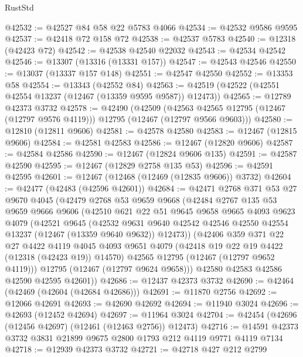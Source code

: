 \begin{lexlean}{RustStd}
\begin{coremodule}
@42532 := @42527 @84 @58 @22 @5783 @4066
@42534 := @42532 @9586 @9595
@42537 := @42418 @72 @158 @72
@42538 := @42537 @5783
@42540 := @12318 (@42423 @72)
@42542 := @42538 @42540 @22032
@42543 := @42534 @42542
@42546 := @13307 (@13316 (@13331 @157))
@42547 := @42543 @42546
@42550 := @13037 (@13337 @157 @148)
@42551 := @42547 @42550
@42552 := @13353 @58
@42554 := @13343 (@42552 @84)
@42563 := @42519 (@42522 (@42551 @42554 @13237 (@12467 (@13359 @9595 @9587)) @12473))
@42565 := @12789 @42373 @3732
@42578 := @42490
    (@42509
      (@42563 @42565 @12795 (@12467 (@12797 @9576 @4119)))
      @12795
      (@12467 (@12797 @9566 @9603)))
@42580 := @12810 (@12811 @9606)
@42581 := @42578 @42580
@42583 := @12467 (@12815 @9606)
@42584 := @42581 @42583
@42586 := @12467 (@12820 @9606)
@42587 := @42584 @42586
@42590 := @12467 (@12824 @9606 @135)
@42591 := @42587 @42590
@42595 := @12467 (@12829 @2758 @135 @53)
@42596 := @42591 @42595
@42601 := @12467 (@12468 (@12469 (@12835 @9606)) @3732)
@42604 := @42477 (@42483 (@42596 @42601))
@42684 := @42471
    @2768
    @371
    @53
    @27
    @9670
    @4045
    (@42479
      @2768
      @53
      @9659
      @9668
      (@42484
        @2767
        @135
        @53
        @9659
        @9666
        @9606
        (@42510
          @621
          @22
          @51
          @9645
          @9658
          @9665
          @4093
          @9623
          @4079
          (@42521
            @9645
            (@42532
              @9631
              @9640
              @42542
              @42546
              @42550
              @42554
              @13237
              (@12467 (@13359 @9640 @9632))
              @12473))
          (@42406
            @359
            @371
            @22
            @27
            @4422
            @4119
            @4045
            @4093
            @9651
            @4079
            (@42418 @19 @22 @19 @4422 (@12318 (@42423 @19)) @14570)
            @42565
            @12795
            (@12467 (@12797 @9652 @4119)))
          @12795
          (@12467 (@12797 @9624 @9658)))
        @42580
        @42583
        @42586
        @42590
        @42595
        @42601))
@42686 := @12437 @42373 @3732
@42690 := @42464 (@42469 (@42604 (@42684 @42686)))
@42691 := @11870 @2756
@42692 := @12066 @42691
@42693 := @42690 @42692
@42694 := @11940 @3024
@42696 := @42693 (@12452 @42694)
@42697 := @11964 @3024
@42704 := @42454 (@42696 (@12456 @42697) (@12461 (@12463 @2756)) @12473)
@42716 := @14591 @42373 @3732 @3831 @21899 @9675 @2800 @1793 @212 @4119 @9771 @4119 @7134
@42718 := @12939 @42373 @3732
@42721 := @42718 @427 @212 @2799

\end{coremodule}
\end{lexlean}
